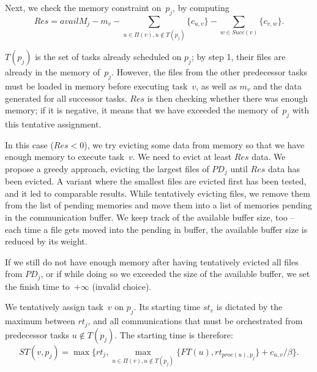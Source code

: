 \documentclass[conference]{IEEEtran}
\newcommand{\PD}{PD}
\newcommand{\AB}[1]{{\color{purple}[AB: #1]}}
\begin{document}
    \smallskip
     Next, we check the memory constraint on~$p_j$, by computing
    \[Res = availM_j - m_v - \sum_{u \in \Pi(v), u\notin T(p_j)}  \{c_{u,v}\}
    - \sum_{w\in Succ(v)}  \{c_{v,w}\}.\]

    $T(p_j)$ is the set of tasks already scheduled on $p_j$; by step 1, their files are
    already in the memory of~$p_j$. However, the files from the
    other predecessor tasks must be loaded in memory before executing task~$v$,
    as well as $m_v$ and the data generated for all successor tasks.
    $Res$ is then checking whether there was enough memory; if it is negative,
    it means that we have exceeded the memory of~$p_j$ with this tentative
    assignment.

    In this case ($Res <0$), we try evicting
    some data from memory so that we have enough memory to execute task~$v$.
    We need to evict at least $Res$ data.
    We propose a greedy approach, evicting the largest files of $\PD_j$ until $Res$ data has been evicted. 
    A variant where the smallest files are evicted first has been tested, and it led to comparable results. 
%    
    While tentatively evicting files, we remove them from the list of pending memories and move them into a list
    of memories pending in the communication buffer.
    We keep track of the available buffer size, too -- each time a file gets moved into the pending in buffer, 
    the available buffer size is reduced by its weight.

    If we still do not have enough memory after having tentatively evicted all files from $\PD_j$,
    or if while doing so we exceeded the size of the available buffer,
    we set the finish time to~$+\infty$ (invalid choice).

    \smallskip
     We tentatively assign task~$v$ on $p_j$.
    Its starting time $st_v$ is dictated by the maximum between $rt_j$, and all communications that
    must be orchestrated from predecessor tasks $u\notin T(p_j)$.
    The starting time is therefore:\\[-.7cm]
    
   {\footnotesize{ \[ST(v, p_j) = \max{ \{rt_j, \max_{ u \in \Pi(v), u\notin T(p_j)}\{ FT(u) , rt_{proc(u), p_j}\} + c_{u,v} / \beta \} .} \]}}
   
\end{document}

